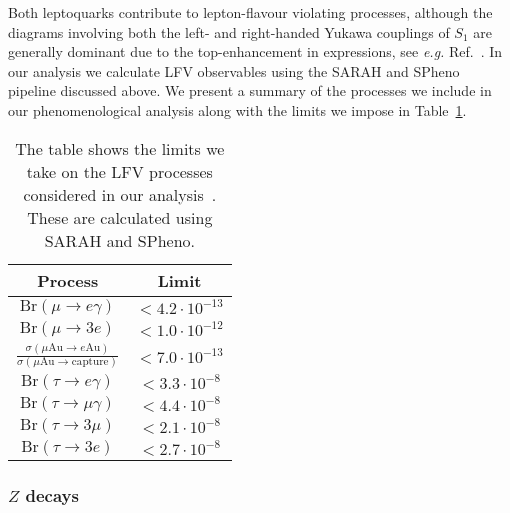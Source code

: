 Both leptoquarks contribute to lepton-flavour violating processes, although the
diagrams involving both the left- and right-handed Yukawa couplings of $S_{1}$
are generally dominant due to the top-enhancement in expressions, see
\textit{e.g.} Ref.~\cite{Angel:2013hla}. In our analysis we calculate LFV
observables using the \textsf{SARAH} and \textsf{SPheno} pipeline discussed
above. We present a summary of the processes we include in our phenomenological
analysis along with the limits we impose in Table~\ref{tab:ch4-lfv-summary}.

\begin{table}[t]
  \centering
  \bgroup
  \def\arraystretch{1.3}
  \begin{tabular}{cc}
    \toprule
    Process & Limit \\
    \midrule
    $\text{Br}(\mu \to e \gamma)$ & $< 4.2 \cdot 10^{-13}$   \\
    $\text{Br}(\mu \to 3 e)$ &  $< 1.0 \cdot 10^{-12}$  \\
    $\frac{\sigma(\mu \text{Au}\to e\text{Au})}{\sigma(\mu \text{Au}\to \text{capture})}$ &  $< 7.0 \cdot 10^{-13}$  \\
    $\text{Br}(\tau \to e \gamma)$ & $< 3.3 \cdot 10^{-8}$   \\
    $\text{Br}(\tau \to \mu \gamma)$ &$< 4.4 \cdot 10^{-8}$    \\
    $\text{Br}(\tau \to 3\mu)$ &  $< 2.1 \cdot 10^{-8}$  \\
    $\text{Br}(\tau \to 3 e)$ &  $< 2.7 \cdot 10^{-8}$  \\
    \bottomrule
  \end{tabular}
  \egroup
  \caption[The table shows the limits we take on the LFV processes considered in
  our analysis~\cite{Olive:2016xmw}.]{The table shows the limits we take on the
    LFV processes considered in our analysis~\cite{Olive:2016xmw}. These are
    calculated using \textsf{SARAH} and \textsf{SPheno}.}
  \label{tab:ch4-lfv-summary}
\end{table}

\subsubsection{$Z$ decays}

